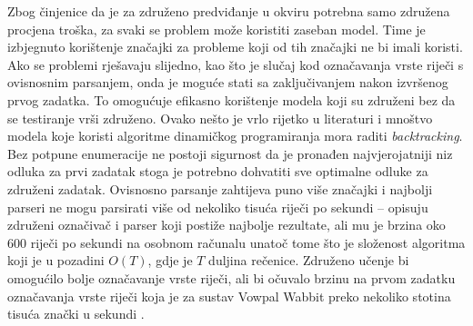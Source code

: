 Zbog činjenice da je za združeno predviđanje u \lts{} okviru potrebna samo
združena procjena troška, za svaki se problem može koristiti zaseban model. Time
je izbjegnuto korištenje značajki za probleme koji od tih značajki ne bi imali
koristi. Ako se problemi rješavaju slijedno, kao što je slučaj kod označavanja
vrste riječi s ovisnosnim parsanjem, onda je moguće stati sa zaključivanjem
nakon izvršenog prvog zadatka. To omogućuje efikasno korištenje modela koji su
združeni bez da se testiranje vrši združeno. Ovako nešto je vrlo rijetko u
literaturi i mnoštvo modela koje koristi algoritme dinamičkog programiranja mora
raditi \textit{backtracking}. Bez potpune enumeracije ne postoji sigurnost da je
pronađen najvjerojatniji niz odluka za prvi zadatak stoga je potrebno dohvatiti
sve optimalne odluke za združeni zadatak. Ovisnosno parsanje zahtijeva puno
više značajki i najbolji parseri ne mogu parsirati više od nekoliko tisuća
riječi po sekundi -- \citet{andor2016globally} opisuju združeni označivač i
parser koji postiže najbolje rezultate, ali mu je brzina oko 600 riječi po
sekundi na osobnom računalu unatoč tome što je složenost algoritma koji je u
pozadini $O(T)$, gdje je $T$ duljina rečenice. Združeno učenje bi omogućilo
bolje označavanje vrste riječi, ali bi očuvalo brzinu na prvom zadatku
označavanja vrste riječi koja je za sustav Vowpal Wabbit preko nekoliko stotina
tisuća znački u sekundi \citep{daume14lts}.
